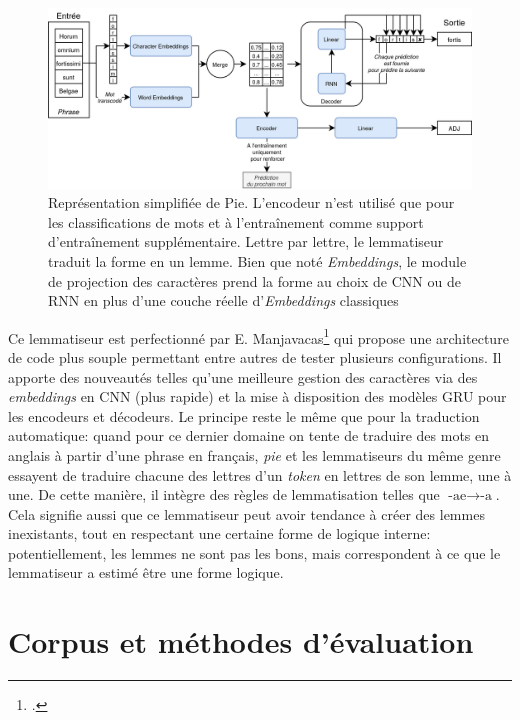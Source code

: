 \begin{figure}[h]
    \centering
    \includegraphics[width=\linewidth]{results/lemmatisation/outils/Pie.png}
    \caption{Représentation simplifiée de Pie. L'encodeur n'est utilisé que pour les classifications de mots et à l'entraînement comme support d'entraînement supplémentaire. Lettre par lettre, le lemmatiseur traduit la forme en un lemme. Bien que noté \textit{Embeddings}, le module de projection des caractères prend la forme au choix de CNN ou de RNN en plus d'une couche réelle d'\textit{Embeddings} classiques}
    \label{lemmatisation:outils:pie}
\end{figure}

Ce lemmatiseur est perfectionné par E. Manjavacas\footcite{manjavacas_improving_2019} qui propose une architecture de code plus souple permettant entre autres de tester plusieurs configurations. Il apporte des nouveautés telles qu'une meilleure gestion des caractères via des \textit{embeddings} en CNN (plus rapide) et la mise à disposition des modèles GRU pour les encodeurs et décodeurs. Le principe reste le même que pour la traduction automatique: quand pour ce dernier domaine on tente de traduire des mots en anglais à partir d'une phrase en français, \textit{pie} et les lemmatiseurs du même genre essayent de traduire chacune des lettres d'un \textit{token} en lettres de son lemme, une à une. De cette manière, il intègre des règles de lemmatisation telles que \textit{$\textrm{-ae} \rightarrow \textrm{-a}$}. Cela signifie aussi que ce lemmatiseur peut avoir tendance à créer des lemmes inexistants, tout en respectant une certaine forme de logique interne: potentiellement, les lemmes ne sont pas les bons, mais correspondent à ce que le lemmatiseur a estimé être une forme logique. %

\section{Corpus et méthodes d'évaluation}
\label{subsec:lemma_corpus}


